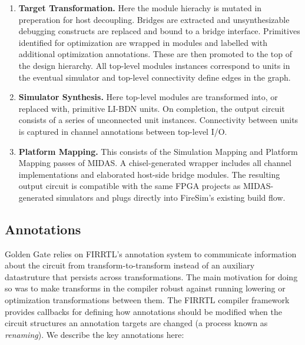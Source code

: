 \begin{enumerate}

\item \textbf{Target Transformation.} Here the
module hierachy is mutated in preperation for host decoupling. Bridges are
extracted and unsynthesizable debugging constructs are replaced and
bound to a bridge interface. Primitives identified for optimization are
wrapped in modules and labelled with additional optimization annotations. These are then promoted to the top of the design hierarchy. 
All top-level modules instances correspond to units in the eventual
simulator and top-level connectivity define edges in the graph.

\item \textbf{Simulator Synthesis.} Here top-level modules are transformed
into, or replaced with, primitive LI-BDN units. On completion, the output circuit consists of a
series of unconnected unit instances. Connectivity between units is captured in
channel annotations between top-level I/O.

\item \textbf{Platform Mapping.} This consists of the Simulation Mapping and
Platform Mapping passes of MIDAS. A chisel-generated wrapper includes all
channel implementations and elaborated host-side bridge modules. The resulting output
circuit is compatible with the same FPGA projects as MIDAS-generated
simulators and plugs directly into FireSim's existing build flow.
\end{enumerate}

\subsection{Annotations}
Golden Gate relies on FIRRTL's annotation system to communicate information about the
circuit from transform-to-transform instead of an auxiliary
datastruture that persists across transformations. The main motivation for doing so was to make transforms in the
compiler robust against running lowering or optimization transformations
between them. The FIRRTL compiler framework provides callbacks for defining
how annotations should be modified when the circuit structures an annotation targets are
changed (a process known as \emph{renaming}). We describe the key annotations here:

